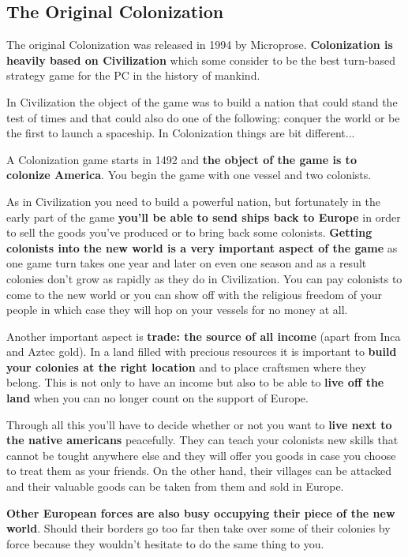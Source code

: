 \documentclass[12pt]{article}
\begin{document}
\hypertarget{The Original Colonization}{\subsection{The Original Colonization}}

The original Colonization was
released in 1994 by Microprose. \textbf{Colonization is heavily based
on Civilization} which some consider to be the best turn-based
strategy game for the PC in the history of mankind.

In Civilization the object of the game was to build a nation that
could stand the test of times and that could also do one of the
following: conquer the world or be the first to launch a
spaceship. In Colonization things are bit different...

A Colonization game starts in 1492 and \textbf{the object of the game
is to colonize America}. You begin the game with one vessel and two
colonists.

As in Civilization you need to build a powerful nation, but
fortunately in the early part of the game \textbf{you'll be able to
send ships back to Europe} in order to sell the goods you've produced
or to bring back some colonists. \textbf{Getting colonists into the
new world is a very important aspect of the game} as one game turn
takes one year and later on even one season and as a result colonies
don't grow as rapidly as they do in Civilization. You can pay
colonists to come to the new world or you can show off with the
religious freedom of your people in which case they will hop on your
vessels for no money at all.

Another important aspect is \textbf{trade: the source of all income}
(apart from Inca and Aztec gold). In a land filled with precious
resources it is important to \textbf{build your colonies at the right
location} and to place craftsmen where they belong. This is not only
to have an income but also to be able to \textbf{live off the land}
when you can no longer count on the support of Europe.

Through all this you'll have to decide whether or not you want to
\textbf{live next to the native americans} peacefully. They can teach
your colonists new skills that cannot be tought anywhere else and they
will offer you goods in case you choose to treat them as your
friends. On the other hand, their villages can be attacked and their
valuable goods can be taken from them and sold in Europe.

\textbf{Other European forces are also busy occupying their piece of
the new world}. Should their borders go too far then take over some
of their colonies by force because they wouldn't hesitate to do the
same thing to you.
\end{document}
